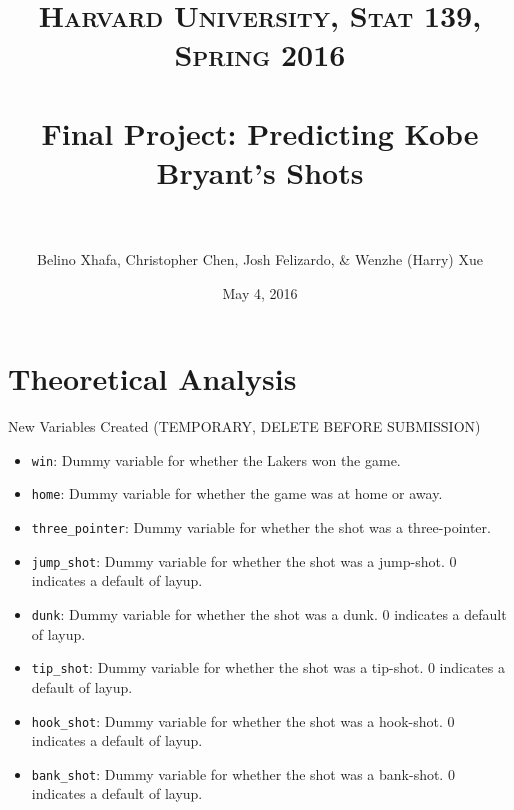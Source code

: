 \documentclass[paper=a4, fontsize=11pt]{scrartcl} %
\title{ 
\normalfont \normalsize 
\textsc{Harvard University, Stat 139, Spring 2016} \\ [25pt] %
\horrule{0.5pt} \\[0.4cm] %
\huge Final Project: Predicting Kobe Bryant's Shots \\ %
\horrule{2pt} \\[0.5cm] %
}
\author{Belino Xhafa, Christopher Chen, Josh Felizardo, \& Wenzhe (Harry) Xue}
\date{\normalsize May 4, 2016} %
\numberwithin{equation}{section} %
\numberwithin{figure}{section} %
\numberwithin{table}{section} %
\begin{document}
\maketitle %

\section{Theoretical Analysis}

\begin{mdframed}[style=MyFrame ]
\begin{center}New Variables Created (TEMPORARY, DELETE BEFORE SUBMISSION)\end{center}
\end{mdframed}
\begin{itemize}
\item \texttt{win}: Dummy variable for whether the Lakers won the game.
\item \texttt{home}: Dummy variable for whether the game was at home or away.
\item \texttt{three\_pointer}: Dummy variable for whether the shot was a three-pointer.
\item \texttt{jump\_shot}: Dummy variable for whether the shot was a jump-shot. $0$ indicates a default of layup.
\item \texttt{dunk}: Dummy variable for whether the shot was a dunk. $0$ indicates a default of layup.
\item \texttt{tip\_shot}: Dummy variable for whether the shot was a tip-shot. $0$ indicates a default of layup.
\item \texttt{hook\_shot}: Dummy variable for whether the shot was a hook-shot. $0$ indicates a default of layup.
\item \texttt{bank\_shot}: Dummy variable for whether the shot was a bank-shot. $0$ indicates a default of layup.


\end{itemize}
\end{document}
